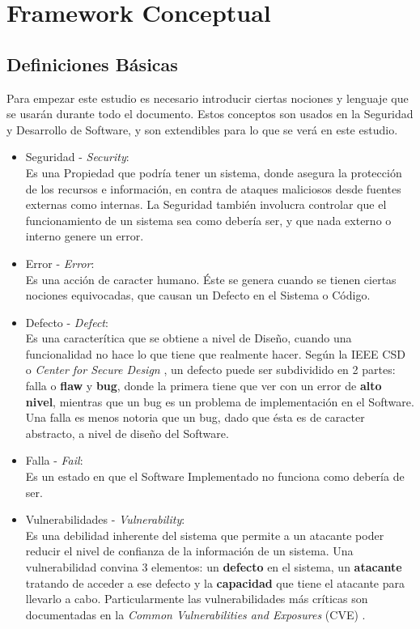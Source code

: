 \chapter{Framework Conceptual}
\label{chap2:FC}


\section{Definiciones Básicas}
\label{chap2:Def}

Para empezar este estudio es necesario introducir ciertas nociones y lenguaje que se usarán durante todo el documento. Estos conceptos son usados en la Seguridad y Desarrollo de Software, y son extendibles para lo que se verá en este estudio.

\begin{itemize}
    \item Seguridad - \textit{Security}:
        \\Es una Propiedad que podría tener un sistema, donde asegura la protección de los recursos e información, en contra de ataques maliciosos desde fuentes externas como internas. La Seguridad también involucra controlar que el funcionamiento de un sistema sea como debería ser, y que nada externo o interno genere un error.
    \item Error - \textit{Error}:
        \\Es una acción de caracter humano. Éste se genera cuando se tienen ciertas nociones equivocadas, que causan un Defecto en el Sistema o Código.
    \item Defecto  - \textit{Defect}:
        \\Es una caracterítica que se obtiene a nivel de Diseño, cuando una funcionalidad no hace lo que tiene que realmente hacer. Según la IEEE CSD o \textit{Center for Secure Design} \cite{ieeecsd2}, un defecto puede ser subdividido en 2 partes: falla o \textbf{flaw} y \textbf{bug}, donde la primera tiene que ver con un error de \textbf{alto nivel}, mientras que un bug es un problema de implementación en el Software. Una falla es menos notoria que un bug, dado que ésta es de caracter abstracto, a nivel de diseño del Software.
    \item Falla - \textit{Fail}:
        \\Es un estado en que el Software Implementado no funciona como debería de ser.
    \item Vulnerabilidades - \textit{Vulnerability}:
        \\Es una debilidad inherente del sistema que permite a un atacante poder reducir el nivel de confianza de la información de un sistema. Una vulnerabilidad convina 3 elementos: un \textbf{defecto} en el sistema, un \textbf{atacante} tratando de acceder a ese defecto y la \textbf{capacidad} que tiene el atacante para llevarlo a cabo. Particularmente las vulnerabilidades más críticas son documentadas en la \textit{Common Vulnerabilities and Exposures} (CVE) \cite{cve}.

\end{itemize}
